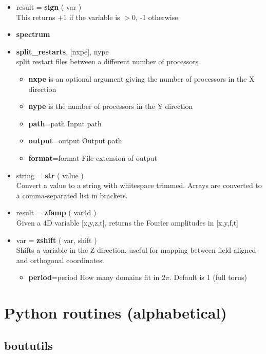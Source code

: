 \documentclass[12pt]{article}
\begin{document}
\begin{itemize}
\item result = {\bf sign} ( var ) \\
  This returns +1 if the variable is $> 0$, -1 otherwise
\item {\bf spectrum}
\item {\bf split\_restarts}, [nxpe], nype \\
  split restart files between a different number of processors
  \begin{itemize}
  \item {\bf nxpe} is an optional argument giving the number of
    processors in the X direction
  \item {\bf nype} is the number of processors in the Y direction
  \item {\bf path}=path      Input path
  \item {\bf output}=output  Output path
  \item {\bf format}=format  File extension of output
  \end{itemize}
\item string = {\bf str} ( value ) \\
  Convert a value to a string with whitespace trimmed. Arrays are
  converted to a comma-separated list in brackets.
\item result = {\bf zfamp} ( var4d )\\
  Given a 4D variable [x,y,z,t], returns the Fourier amplitudes in [x,y,f,t]
\item var = {\bf zshift} ( var, shift ) \\
  Shifts a variable in the Z direction, useful for mapping between field-aligned and orthogonal
  coordinates. 
  \begin{itemize}
  \item {\bf period}=period  How many domains fit in $2\pi$. Default is 1 (full torus)
  \end{itemize}
\end{itemize}

\section{Python routines (alphabetical)}
\label{apx:py_routines}

\subsection{boututils}
\end{document}

